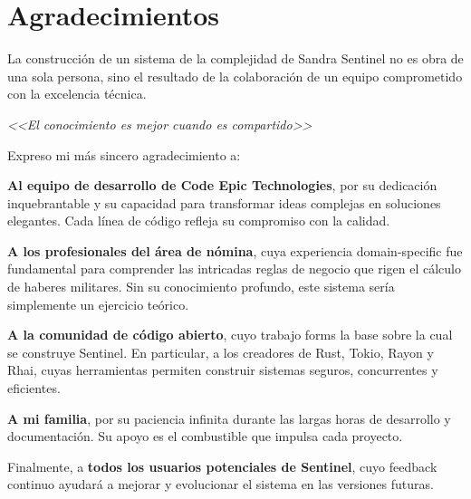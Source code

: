 \chapter*{Agradecimientos}

\bigskip

La construcción de un sistema de la complejidad de Sandra Sentinel no es obra de una sola persona, sino el resultado de la colaboración de un equipo comprometido con la excelencia técnica.

\bigskip

\begin{center}
    \Large
    \textit{<<El conocimiento es mejor cuando es compartido>>}
\end{center}

\bigskip

Expreso mi más sincero agradecimiento a:

\bigskip

\textbf{Al equipo de desarrollo de Code Epic Technologies}, por su dedicación inquebrantable y su capacidad para transformar ideas complejas en soluciones elegantes. Cada línea de código refleja su compromiso con la calidad.

\bigskip

\textbf{A los profesionales del área de nómina}, cuya experiencia domain-specific fue fundamental para comprender las intricadas reglas de negocio que rigen el cálculo de haberes militares. Sin su conocimiento profundo, este sistema sería simplemente un ejercicio teórico.

\bigskip

\textbf{A la comunidad de código abierto}, cuyo trabajo forms la base sobre la cual se construye Sentinel. En particular, a los creadores de Rust, Tokio, Rayon y Rhai, cuyas herramientas permiten construir sistemas seguros, concurrentes y eficientes.

\bigskip

\textbf{A mi familia}, por su paciencia infinita durante las largas horas de desarrollo y documentación. Su apoyo es el combustible que impulsa cada proyecto.

\bigskip

Finalmente, a \textbf{todos los usuarios potenciales de Sentinel}, cuyo feedback continuo ayudará a mejorar y evolucionar el sistema en las versiones futuras.

\vfill
\newpage
